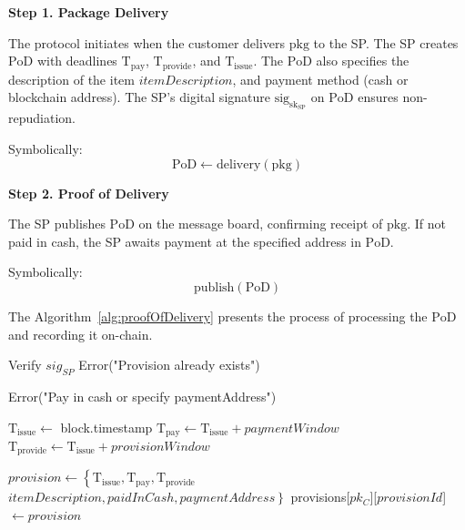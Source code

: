 \documentclass[pdftex,twocolumn,epjc3]{svjour3}
\begin{document}
\noindent \textbf{Step 1. Package Delivery}\label{step-1-package-delivery}

The protocol initiates when the customer delivers $\mathrm{pkg}$ to the SP. The SP creates $\mathrm{PoD}$ with deadlines $\mathrm{T}_\mathrm{pay}$, $\mathrm{T}_\mathrm{provide}$, and $\mathrm{T}_\mathrm{issue}$. The $\mathrm{PoD}$ also specifies the description of the item $itemDescription$, and payment method (cash or blockchain address). The SP's digital signature $\mathrm{sig}_{\mathrm{sk}_\mathrm{SP}}$ on $\mathrm{PoD}$ ensures non-repudiation.

Symbolically: 
\[
\mathrm{PoD \gets delivery(pkg)}
\]

\noindent \textbf{Step 2. Proof of Delivery}\label{step-2-pod}

The SP publishes $\mathrm{PoD}$ on the message board, confirming receipt of $\mathrm{pkg}$. If not paid in cash, the SP awaits payment at the specified address in $\mathrm{PoD}$.

Symbolically: 
\[
\mathrm{publish(PoD)}
\]

The Algorithm~\ref{alg:proofOfDelivery} presents the process of processing the $\mathrm{PoD}$ and recording it on-chain.

\begin{algorithm}
\caption{Algorithm for Registering Proof of Delivery}
\label{alg:proofOfDelivery}
\begin{algorithmic}[1]
    \State Verify $sig_{SP}$
        \State \Return Error("Provision already exists")
    \EndIf

        \State \Return Error("Pay in cash or specify paymentAddress")
    \EndIf

    \State $\mathrm{T}_\mathrm{issue} \gets$ block.timestamp
    \State $\mathrm{T}_\mathrm{pay} \gets \mathrm{T}_\mathrm{issue} + paymentWindow$
    \State $\mathrm{T}_\mathrm{provide} \gets \mathrm{T}_\mathrm{issue} + provisionWindow$

    \State $provision \gets \left\{ \mathrm{T}_\mathrm{issue}, \mathrm{T}_\mathrm{pay}, \mathrm{T}_\mathrm{provide} \right.$
    \State \hspace{\algorithmicindent}$\left. itemDescription, paidInCash, paymentAddress \right\}$
    \State provisions[$pk_C$][$provisionId$] $\gets provision$
\EndFunction
\end{algorithmic}
\end{algorithm}
\end{document}
